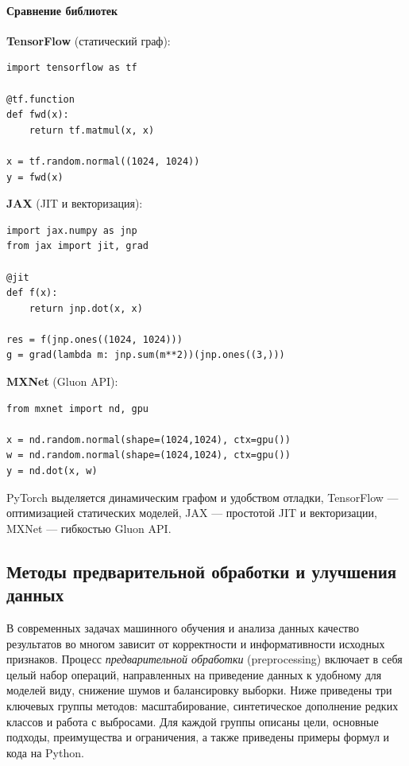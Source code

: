 \paragraph{Сравнение библиотек}
\textbf{TensorFlow} (статический граф):
\begin{center}
\begin{verbatim}
import tensorflow as tf

@tf.function
def fwd(x):
    return tf.matmul(x, x)

x = tf.random.normal((1024, 1024))
y = fwd(x)
\end{verbatim} 
\end{center}

\textbf{JAX} (JIT и векторизация):
\begin{center}
\begin{verbatim}
import jax.numpy as jnp
from jax import jit, grad

@jit
def f(x):
    return jnp.dot(x, x)

res = f(jnp.ones((1024, 1024)))
g = grad(lambda m: jnp.sum(m**2))(jnp.ones((3,)))
\end{verbatim} 

\textbf{MXNet} (Gluon API):
\begin{center}
\begin{verbatim}
from mxnet import nd, gpu

x = nd.random.normal(shape=(1024,1024), ctx=gpu())
w = nd.random.normal(shape=(1024,1024), ctx=gpu())
y = nd.dot(x, w)
\end{verbatim} 
\end{center}

PyTorch выделяется динамическим графом и удобством отладки, TensorFlow — оптимизацией статических моделей, JAX — простотой JIT и векторизации, MXNet — гибкостью Gluon API.

\subsection{Методы предварительной обработки и улучшения данных}

В современных задачах машинного обучения и анализа данных качество результатов во многом зависит от корректности и информативности исходных признаков. Процесс \emph{предварительной обработки} (preprocessing) включает в себя целый набор операций, направленных на приведение данных к удобному для моделей виду, снижение шумов и балансировку выборки. Ниже приведены три ключевых группы методов: масштабирование, синтетическое дополнение редких классов и работа с выбросами. Для каждой группы описаны цели, основные подходы, преимущества и ограничения, а также приведены примеры формул и кода на Python.


\end{center}
